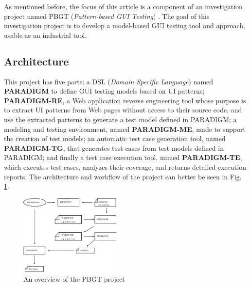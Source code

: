 \documentclass[conference]{IEEEtran}
\begin{document}
As mentioned before, the focus of this article is a component of an investigation project named PBGT (\textit{Pattern-based GUI Testing}) \cite{moreira2013pattern}. The goal of this investigation project is to develop a model-based GUI testing tool and approach, usable as an industrial tool. 

\subsection{Architecture}
This project has five parts: a DSL (\textit{Domain Specific Language}) named \textbf{PARADIGM} to define GUI testing models based on UI patterns; \textbf{PARADIGM-RE}, a Web application reverse engineering tool whose purpose is to extract UI patterns from Web pages without access to their source code, and use the extracted patterns to generate a test model defined in PARADIGM; a modeling and testing environment, named \textbf{PARADIGM-ME}, made to support the creation of test models; an automatic test case generation tool, named \textbf{PARADIGM-TG}, that generates test cases from test models defined in PARADIGM; and finally a test case execution tool, named \textbf{PARADIGM-TE}, which executes test cases, analyzes their coverage, and returns detailed execution reports. The architecture and workflow of the project can better be seen in Fig. \ref{fig:pbgt}.

\begin{figure}[!htb]
\centering
\includegraphics[width=0.45\textwidth]{pbgt}
\caption{An overview of the PBGT project}
\label{fig:pbgt}
\end{figure}
\end{document}
